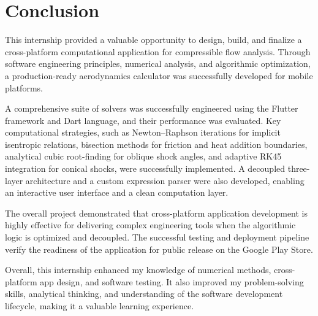 \chapter{Conclusion}

This internship provided a valuable opportunity to design, build, and finalize a cross-platform computational application for compressible flow analysis. Through software engineering principles, numerical analysis, and algorithmic optimization, a production-ready aerodynamics calculator was successfully developed for mobile platforms.

A comprehensive suite of solvers was successfully engineered using the Flutter framework and Dart language, and their performance was evaluated. Key computational strategies, such as Newton--Raphson iterations for implicit isentropic relations, bisection methods for friction and heat addition boundaries, analytical cubic root-finding for oblique shock angles, and adaptive RK45 integration for conical shocks, were successfully implemented. A decoupled three-layer architecture and a custom expression parser were also developed, enabling an interactive user interface and a clean computation layer.

The overall project demonstrated that cross-platform application development is highly effective for delivering complex engineering tools when the algorithmic logic is optimized and decoupled. The successful testing and deployment pipeline verify the readiness of the application for public release on the Google Play Store.

Overall, this internship enhanced my knowledge of numerical methods, cross-platform app design, and software testing. It also improved my problem-solving skills, analytical thinking, and understanding of the software development lifecycle, making it a valuable learning experience.
